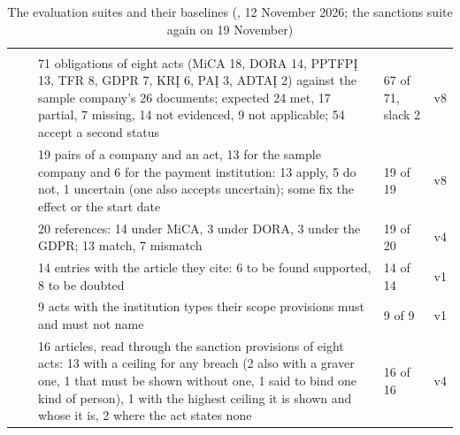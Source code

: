 \begin{xltabular}{\textwidth}{@{}L{20mm}L{32mm}YR{16mm}L{24mm}@{}}
\caption{The evaluation suites and their baselines (, 12 November 2026; the sanctions suite again on 19 November)}\label{tab:control:suites}\\
\toprule
{} &  &  &  &  \\
\midrule
\endfirsthead
\toprule
{} &  &  &  &  \\
\midrule
\endhead
\bottomrule
\endlastfoot
{} &  & 71 obligations of eight acts (MiCA 18, DORA 14, PPTFPĮ 13, TFR 8, GDPR 7, KRĮ 6, PAĮ 3, ADTAĮ 2) against the sample company's 26 documents; expected 24 met, 17 partial, 7 missing, 14 not evidenced, 9 not applicable; 54 accept a second status & 67 of 71, slack 2 & v8 \\
 &  & 19 pairs of a company and an act, 13 for the sample company and 6 for the payment institution: 13 apply, 5 do not, 1 uncertain (one also accepts uncertain); some fix the effect or the start date & 19 of 19 & v8 \\
 &  & 20 references: 14 under MiCA, 3 under DORA, 3 under the GDPR; 13 match, 7 mismatch & 19 of 20 & v4 \\
 &  & 14 entries with the article they cite: 6 to be found supported, 8 to be doubted & 14 of 14 & v1 \\
 &  & 9 acts with the institution types their scope provisions must and must not name & 9 of 9 & v1 \\
 &  & 16 articles, read through the sanction provisions of eight acts: 13 with a ceiling for any breach (2 also with a graver one, 1 that must be shown without one, 1 said to bind one kind of person), 1 with the highest ceiling it is shown and whose it is, 2 where the act states none & 16 of 16 & v4 \\
\end{xltabular}

